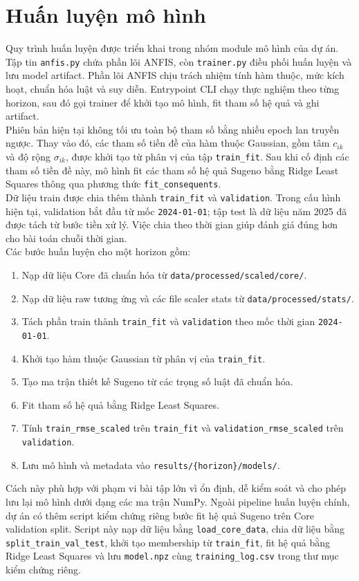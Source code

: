 \section{Huấn luyện mô hình}

Quy trình huấn luyện được triển khai trong nhóm module mô hình của dự án. Tập tin \texttt{anfis.py} chứa phần lõi ANFIS, còn \texttt{trainer.py} điều phối huấn luyện và lưu model artifact.
Phần lõi ANFIS chịu trách nhiệm tính hàm thuộc, mức kích hoạt, chuẩn hóa luật và suy diễn. Entrypoint CLI chạy thực nghiệm theo từng horizon, sau đó gọi trainer để khởi tạo mô hình, fit tham số hệ quả và ghi artifact.
\\
Phiên bản hiện tại không tối ưu toàn bộ tham số bằng nhiều epoch lan truyền ngược. Thay vào đó, các tham số tiền đề của hàm thuộc Gaussian, gồm tâm $c_{ik}$ và độ rộng $\sigma_{ik}$, được khởi tạo từ phân vị của tập \texttt{train\_fit}. Sau khi cố định các tham số tiền đề này, mô hình fit các tham số hệ quả Sugeno bằng Ridge Least Squares thông qua phương thức \texttt{fit\_consequents}.
\\
Dữ liệu train được chia thêm thành \texttt{train\_fit} và \texttt{validation}. Trong cấu hình hiện tại, validation bắt đầu từ mốc \texttt{2024-01-01}; tập test là dữ liệu năm 2025 đã được tách từ bước tiền xử lý. Việc chia theo thời gian giúp đánh giá đúng hơn cho bài toán chuỗi thời gian.
\\
Các bước huấn luyện cho một horizon gồm:
\begin{enumerate}[leftmargin=1.2cm]
  \item Nạp dữ liệu Core đã chuẩn hóa từ \texttt{data/processed/scaled/core/}.
  \item Nạp dữ liệu raw tương ứng và các file scaler stats từ \texttt{data/processed/stats/}.
  \item Tách phần train thành \texttt{train\_fit} và \texttt{validation} theo mốc thời gian \texttt{2024-01-01}.
  \item Khởi tạo hàm thuộc Gaussian từ phân vị của \texttt{train\_fit}.
  \item Tạo ma trận thiết kế Sugeno từ các trọng số luật đã chuẩn hóa.
  \item Fit tham số hệ quả bằng Ridge Least Squares.
  \item Tính \texttt{train\_rmse\_scaled} trên \texttt{train\_fit} và \texttt{validation\_rmse\_scaled} trên \texttt{validation}.
  \item Lưu mô hình và metadata vào \texttt{results/\{horizon\}/models/}.
\end{enumerate}
Cách này phù hợp với phạm vi bài tập lớn vì ổn định, dễ kiểm soát và cho phép lưu lại mô hình dưới dạng các ma trận NumPy. Ngoài pipeline huấn luyện chính, dự án có thêm script kiểm chứng riêng bước fit hệ quả Sugeno trên Core validation split. Script này nạp dữ liệu bằng \texttt{load\_core\_data}, chia dữ liệu bằng \texttt{split\_train\_val\_test}, khởi tạo membership từ \texttt{train\_fit}, fit hệ quả bằng Ridge Least Squares và lưu \texttt{model.npz} cùng \texttt{training\_log.csv} trong thư mục kiểm chứng riêng.

